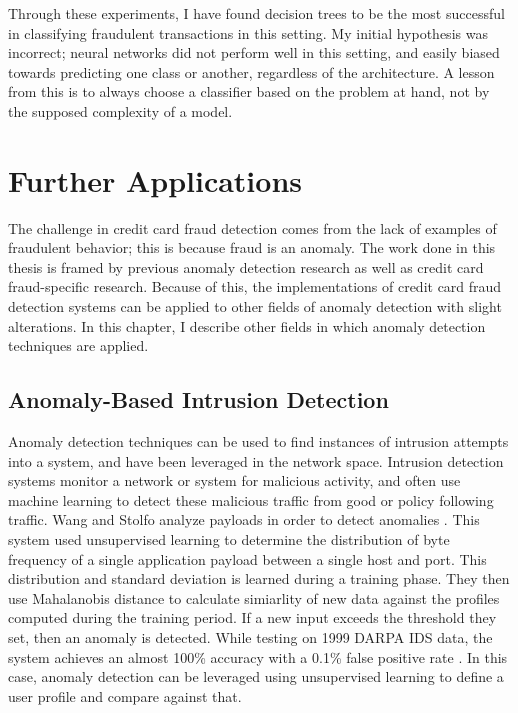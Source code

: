 \documentclass[midd]{thesis}
\begin{document}
Through these experiments, I have found decision trees to be the most successful in classifying fraudulent transactions in this setting. My initial hypothesis was incorrect; neural networks did not perform well in this setting, and easily biased towards predicting one class or another, regardless of the architecture. A lesson from this is to always choose a classifier based on the problem at hand, not by the supposed complexity of a model. 




\pagebreak
\chapter{Further Applications}
\label{sec:future}

The challenge in credit card fraud detection comes from the lack of examples of fraudulent behavior; this is because fraud is an anomaly. The work done in this thesis is framed by previous anomaly detection research as well as credit card fraud-specific research. Because of this, the implementations of credit card fraud detection systems can be applied to other fields of anomaly detection with slight alterations. In this chapter, I describe other fields in which anomaly detection techniques are applied.

\section{Anomaly-Based Intrusion Detection}

Anomaly detection techniques can be used to find instances of intrusion attempts into a system, and have been leveraged in the network space. Intrusion detection systems monitor a network or system for malicious activity, and often use machine learning to detect these malicious traffic from good or policy following traffic. Wang and Stolfo analyze payloads in order to detect anomalies \cite{Wang2004}. This system used unsupervised learning to determine the distribution of byte frequency of a single application payload between a single host and port. This distribution and standard deviation is learned during a training phase. They then use Mahalanobis distance to calculate simiarlity of new data against the profiles computed during the training period. If a new input exceeds the threshold they set, then an anomaly is detected. While testing on 1999 DARPA IDS data, the system achieves an almost 100\% accuracy with a 0.1\% false positive rate \cite{Wang2004}. In this case, anomaly detection can be leveraged using unsupervised learning to define a user profile and compare against that.    
\end{document}
